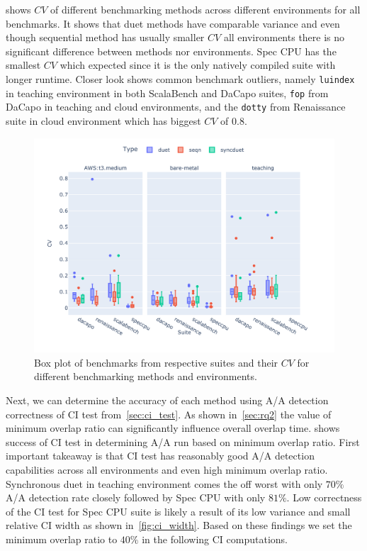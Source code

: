  shows $CV$ of different benchmarking methods across different environments for all benchmarks.
It shows that duet methods have comparable variance and even though sequential method has usually smaller $CV$ all environments there is no significant difference between methods nor environments.
Spec CPU has the smallest $CV$ which expected since it is the only natively compiled suite with longer runtime.
Closer look shows common benchmark outliers, namely \lstinline{luindex} in teaching environment in both ScalaBench and DaCapo suites, \lstinline{fop} from DaCapo in teaching and cloud environments, and the \lstinline{dotty} from Renaissance suite in cloud environment which has biggest $CV$ of $0.8$.

\begin{figure}
	\centering
	\includegraphics[width=1\linewidth]{./figures/cv.pdf}
	\caption{
		Box plot of benchmarks from respective suites and their $CV$ for different benchmarking methods and environments.
	}
	\label{fig:cv}
\end{figure}

Next, we can determine the accuracy of each method using A/A detection correctness of CI test from~\cref{sec:ci_test}.
As shown in~\cref{sec:rq2} the value of minimum overlap ratio can significantly influence overall overlap time.
 shows success of CI test in determining A/A run based on minimum overlap ratio.
First important takeaway is that CI test has reasonably good A/A detection capabilities across all environments and even high minimum overlap ratio.
Synchronous duet in teaching environment comes the off worst with only $70\%$ A/A detection rate closely followed by Spec CPU with only $81\%$.
Low correctness of the CI test for Spec CPU suite is likely a result of its low variance and small relative CI width as shown in~\cref{fig:ci_width}.
Based on these findings we set the minimum overlap ratio to $40\%$ in the following CI computations.

